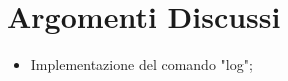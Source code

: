 \section{Argomenti Discussi}
	\begin{itemize}
		\item Implementazione del comando "log";
	\end{itemize}